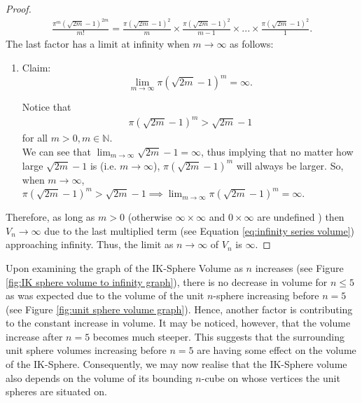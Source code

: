 \begin{proof}
    \begin{align}\label{eq:infinity series volume}
        \frac{\pi^m{\left(\sqrt{2m}-1\right)}^{2m}}{m!}=\frac{\pi(\sqrt{2m}-1)^2}{m} \times \frac{\pi(\sqrt{2m}-1)^2}{m-1} \times ... \times \frac{\pi(\sqrt{2m}-1)^2}{1}.
    \end{align}
    The last factor has a limit at infinity when $m \to \infty$ as follows:
    \begin{enumerate}
        \item Claim: $$\lim_{m\to\infty}\pi\left(\sqrt{2m}-1\right)^m=\infty.$$
        \begin{subproof}[Subproof]
            Notice that 
            \begin{align*}
                \pi\left(\sqrt{2m}-1\right)^m > \sqrt{2m}-1
            \end{align*}
            for all $m>0, m \in \mathbb{N}$.\\ 
            We can see that $\lim_{m\to\infty}\sqrt{2m}-1=\infty$, thus implying that no matter how large $\sqrt{2m}-1$ is (i.e. $m\to\infty$), $\pi(\sqrt{2m}-1)^m$ will always be larger. So, when $m\to\infty$, $\pi(\sqrt{2m}-1)^m > \sqrt{2m}-1 \implies \lim_{m\to\infty}\pi(\sqrt{2m}-1)^m=\infty$.
        \end{subproof}
    \end{enumerate}
    Therefore, as long as $m > 0$ (otherwise $\infty\times\infty$ and $0\times\infty$ are undefined \cite{al2008indeterminate}) then $V_n \to \infty$ due to the last multiplied term (see Equation \ref{eq:infinity series volume}) approaching infinity. Thus, the limit as $n \to \infty$ of $V_n$ is $\infty$. 
\end{proof}

Upon examining the graph of the IK-Sphere Volume as $n$ increases (see Figure \ref{fig:IK sphere volume to infinity graph}), there is no decrease in volume for $n \leq 5$ as was expected due to the volume of the unit $n$-sphere increasing before $n=5$ (see Figure \ref{fig:unit sphere volume graph}). Hence, another factor is contributing to the constant increase in volume. It may be noticed, however, that the volume increase after $n=5$ becomes much steeper. This suggests that the surrounding unit sphere volumes increasing before $n=5$ are having some effect on the volume of the IK-Sphere. Consequently, we may now realise that the IK-Sphere volume also depends on the volume of its bounding $n$-cube on whose vertices the unit spheres are situated on. 

